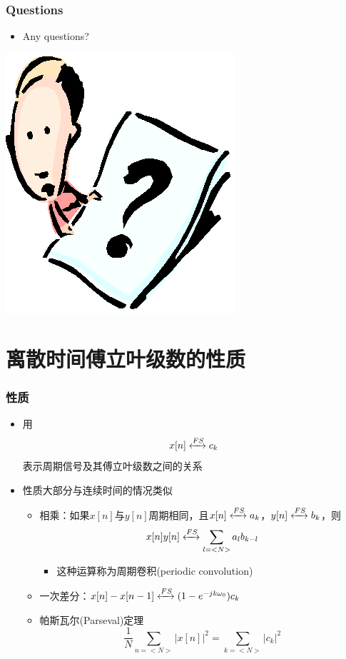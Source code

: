 \documentclass[CJKutf8,xcolor=pdftex,dvipsnames,table]{beamer}
\begin{document}
\begin{CJK*}{UTF8}{song}
  \begin{frame}
    \frametitle{Questions}
    \begin{itemize}
    \item Any questions?
    \end{itemize}
    \begin{center}
      \includegraphics[scale=.5]{question}
    \end{center}
  \end{frame}  
  
  \section{离散时间傅立叶级数的性质}  
  
  \begin{frame}
    \frametitle{性质}
    \begin{itemize}
    \item 用
    \[ x[n] \xleftrightarrow{FS} c_k \]
    表示周期信号及其傅立叶级数之间的关系    
    \item 性质大部分与连续时间的情况类似
    	\begin{itemize}
		\item 相乘：如果$x[n]$与$y[n]$周期相同，且$x[n] \xleftrightarrow{FS} a_k$，$y[n] \xleftrightarrow{FS} b_k$，则\[x[n]y[n] \xleftrightarrow{FS} \sum_{l=<N>}a_l b_{k-l}\]
			\begin{itemize}
			\item 这种运算称为周期卷积(periodic convolution)
			\end{itemize}
    	\item 一次差分：$x[n] - x[n-1] \xleftrightarrow{FS} (1-e^{-jk\omega_0}) c_k $
		\item 帕斯瓦尔(Parseval)定理\[ \frac{1}{N}\sum_{n=<N>}|x[n]|^2 = \sum_{k=<N>} |c_k|^2 \]
    	\end{itemize}
	\end{itemize}
  \end{frame}    
      

\end{CJK*}
\end{document}
